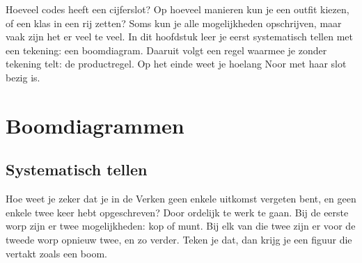 Hoeveel codes heeft een cijferslot? Op hoeveel manieren kun je een outfit kiezen, of een klas in een rij zetten? Soms kun je alle mogelijkheden opschrijven, maar vaak zijn het er veel te veel. In dit hoofdstuk leer je eerst systematisch tellen met een tekening: een boomdiagram. Daaruit volgt een regel waarmee je zonder tekening telt: de productregel. Op het einde weet je hoelang Noor met haar slot bezig is.

\begin{oefeningen}[Start]

\end{oefeningen}


\section{Boomdiagrammen}

\subsection{Systematisch tellen}

Hoe weet je zeker dat je in de Verken geen enkele uitkomst vergeten bent, en geen enkele twee keer hebt opgeschreven? Door ordelijk te werk te gaan. Bij de eerste worp zijn er twee mogelijkheden: kop of munt. Bij elk van die twee zijn er voor de tweede worp opnieuw twee, en zo verder. Teken je dat, dan krijg je een figuur die vertakt zoals een boom.


